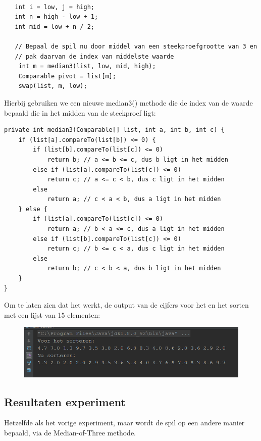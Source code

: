 \documentclass[12pt,notitlepage]{article}
\begin{document}
\begin{lstlisting}

   int i = low, j = high;
   int n = high - low + 1;
   int mid = low + n / 2;

   // Bepaal de spil nu door middel van een steekproefgrootte van 3 en
   // pak daarvan de index van middelste waarde
    int m = median3(list, low, mid, high);
    Comparable pivot = list[m];
    swap(list, m, low);

\end{lstlisting}

Hierbij gebruiken we een nieuwe median3() methode die de index van de waarde bepaald die in het midden van de steekproef ligt:

\begin{lstlisting}
private int median3(Comparable[] list, int a, int b, int c) {
    if (list[a].compareTo(list[b]) <= 0) {
        if (list[b].compareTo(list[c]) <= 0)
            return b; // a <= b <= c, dus b ligt in het midden
        else if (list[a].compareTo(list[c]) <= 0)
            return c; // a <= c < b, dus c ligt in het midden
        else
            return a; // c < a < b, dus a ligt in het midden
    } else {
        if (list[a].compareTo(list[c]) <= 0)
            return a; // b < a <= c, dus a ligt in het midden
        else if (list[b].compareTo(list[c]) <= 0)
            return c; // b <= c < a, dus c ligt in het midden
        else
            return b; // c < b < a, dus b ligt in het midden
    }
}
\end{lstlisting}

Om te laten zien dat het werkt, de output van de cijfers voor het en het sorten met een lijst van 15 elementen:

\begin{figure}[h!]
\centering
\includegraphics[scale=0.8]{median3_test.png}
\end{figure}


\subsection{Resultaten experiment}

Hetzelfde als het vorige experiment, maar wordt de spil op een andere manier bepaald, via de Median-of-Three methode.
\end{document}
